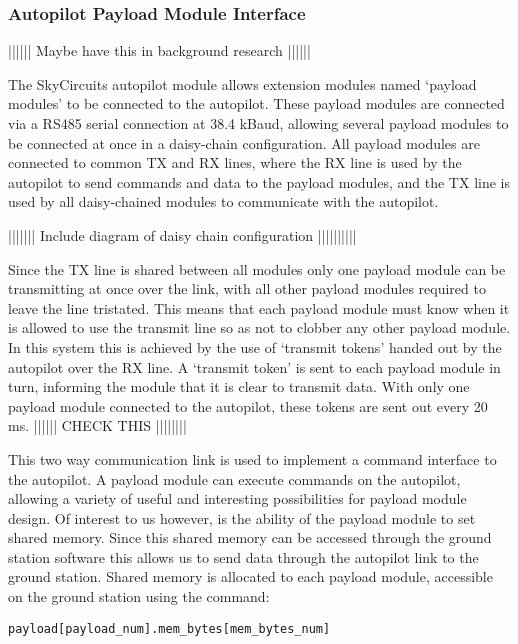 
\subsubsection{Autopilot Payload Module Interface}
\label{sec:autopilot_payload_interface}
|||||| Maybe have this in background research ||||||

The SkyCircuits autopilot module allows extension modules named `payload 
modules' to be connected to the autopilot. These payload modules are connected 
via a RS485 serial connection at 38.4 kBaud, allowing several payload modules
to be connected at once in a daisy-chain configuration. All payload modules are 
connected to common TX and RX lines, where the RX line is used by the
autopilot to send commands and data to the payload modules, and the TX
line is used by all daisy-chained modules to communicate with the autopilot.

||||||| Include diagram of daisy chain configuration ||||||||||

Since the TX line is shared between all modules only one payload module can be 
transmitting at once over the link, with all other payload modules required to
leave the line tristated. This means that each payload module must know when it is
allowed to use the transmit line so as not to clobber any other payload module.
In this system this is achieved by the use of `transmit tokens' handed out 
by the autopilot over the RX line. A `transmit token' is sent to each payload 
module in turn, informing the module that it is clear to transmit data. With 
only one payload module connected to the autopilot, these tokens are sent out 
every 20 ms. |||||| CHECK THIS ||||||||

This two way communication link is used to implement a command interface to 
the autopilot. A payload module can execute commands on the autopilot, 
allowing a variety of useful and interesting possibilities for payload
module design. Of interest to us however, is the ability of the payload
module to set shared memory. Since this shared memory can be accessed 
through the ground station software this allows us to send data through the
autopilot link to the ground station. Shared memory is allocated to 
each payload module, accessible on the ground station using the command:
~\\
\begin{lstlisting}[caption={Accessing shared memory from ground station}, label=lst:gs_shared_mem_set]
payload[payload_num].mem_bytes[mem_bytes_num]
\end{lstlisting}

